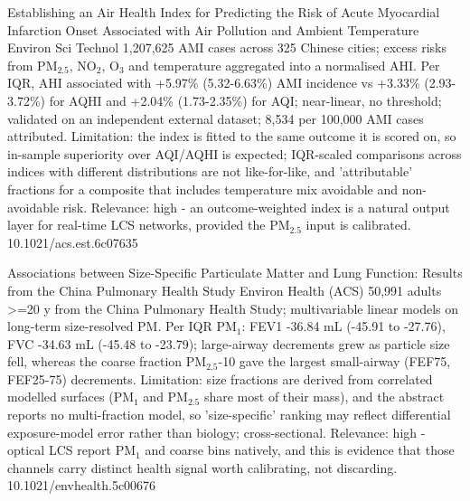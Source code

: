 \documentclass[10pt]{article}
\begin{document}
{Establishing an Air Health Index for Predicting the Risk of Acute Myocardial Infarction Onset Associated with Air Pollution and Ambient Temperature}
{Environ Sci Technol}
{1,207,625 AMI cases across 325 Chinese cities; excess risks from PM$_{2.5}$, NO$_2$, O$_3$ and temperature aggregated into a normalised AHI. Per IQR, AHI associated with +5.97\% (5.32-6.63\%) AMI incidence vs +3.33\% (2.93-3.72\%) for AQHI and +2.04\% (1.73-2.35\%) for AQI; near-linear, no threshold; validated on an independent external dataset; 8,534 per 100,000 AMI cases attributed. Limitation: the index is fitted to the same outcome it is scored on, so in-sample superiority over AQI/AQHI is expected; IQR-scaled comparisons across indices with different distributions are not like-for-like, and 'attributable' fractions for a composite that includes temperature mix avoidable and non-avoidable risk. Relevance: high - an outcome-weighted index is a natural output layer for real-time LCS networks, provided the PM$_{2.5}$ input is calibrated.}
{10.1021/acs.est.6c07635}

\par{}\baselineskip{}\baselineskip
{}

{Associations between Size-Specific Particulate Matter and Lung Function: Results from the China Pulmonary Health Study}
{Environ Health (ACS)}
{50,991 adults >=20 y from the China Pulmonary Health Study; multivariable linear models on long-term size-resolved PM. Per IQR PM$_{1}$: FEV1 -36.84 mL (-45.91 to -27.76), FVC -34.63 mL (-45.48 to -23.79); large-airway decrements grew as particle size fell, whereas the coarse fraction PM$_{2.5}$-10 gave the largest small-airway (FEF75, FEF25-75) decrements. Limitation: size fractions are derived from correlated modelled surfaces (PM$_{1}$ and PM$_{2.5}$ share most of their mass), and the abstract reports no multi-fraction model, so 'size-specific' ranking may reflect differential exposure-model error rather than biology; cross-sectional. Relevance: high - optical LCS report PM$_{1}$ and coarse bins natively, and this is evidence that those channels carry distinct health signal worth calibrating, not discarding.}
{10.1021/envhealth.5c00676}

\par{}\baselineskip{}\baselineskip
{}
\end{document}
